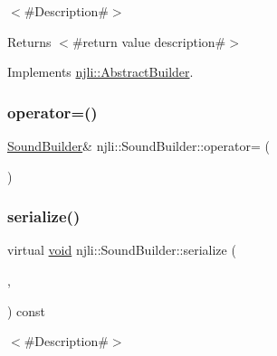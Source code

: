 $<$\#\+Description\#$>$

\begin{DoxyReturn}{Returns}
$<$\#return value description\#$>$ 
\end{DoxyReturn}


Implements \mbox{\hyperlink{classnjli_1_1_abstract_builder_a3e6e553e06d1ca30517ad5fb0bd4d000}{njli\+::\+Abstract\+Builder}}.

\mbox{\label{classnjli_1_1_sound_builder_aee21a4c3543eea9b267ce20d3dfe7dd3}} 
\subsubsection{\texorpdfstring{operator=()}{operator=()}}
{\footnotesize\ttfamily \mbox{\hyperlink{classnjli_1_1_sound_builder}{Sound\+Builder}}\& njli\+::\+Sound\+Builder\+::operator= (\begin{DoxyParamCaption}\item[{const \mbox{\hyperlink{classnjli_1_1_sound_builder}{Sound\+Builder}} \&}]{ }\end{DoxyParamCaption})\hspace{0.3cm}{\ttfamily [protected]}}

\mbox{\label{classnjli_1_1_sound_builder_ade7840ed06c1858a341701c876b82d9a}} 
\subsubsection{\texorpdfstring{serialize()}{serialize()}}
{\footnotesize\ttfamily virtual \mbox{\hyperlink{_thread_8h_af1e856da2e658414cb2456cb6f7ebc66}{void}} njli\+::\+Sound\+Builder\+::serialize (\begin{DoxyParamCaption}\item[{\mbox{\hyperlink{_thread_8h_af1e856da2e658414cb2456cb6f7ebc66}{void}} $\ast$}]{,  }\item[{bt\+Serializer $\ast$}]{ }\end{DoxyParamCaption}) const\hspace{0.3cm}{\ttfamily [virtual]}}

$<$\#\+Description\#$>$


